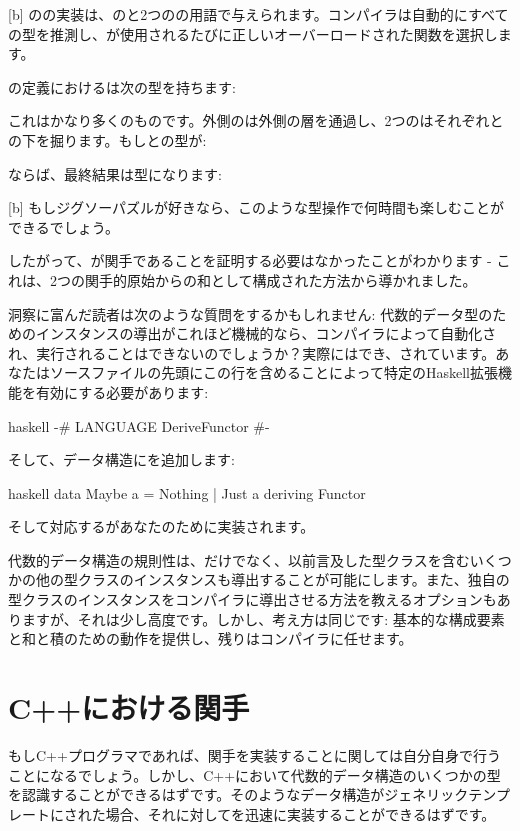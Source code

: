 [b]
のの実装は、のと2つのの用語で与えられます。コンパイラは自動的にすべての型を推測し、が使用されるたびに正しいオーバーロードされた関数を選択します。

の定義におけるは次の型を持ちます: 

これはかなり多くのものです。外側のは外側の層を通過し、2つのはそれぞれとの下を掘ります。もしとの型が: 

ならば、最終結果は型になります: 

[b]
もしジグソーパズルが好きなら、このような型操作で何時間も楽しむことができるでしょう。

したがって、が関手であることを証明する必要はなかったことがわかります - これは、2つの関手的原始からの和として構成された方法から導かれました。

洞察に富んだ読者は次のような質問をするかもしれません: 代数的データ型のためのインスタンスの導出がこれほど機械的なら、コンパイラによって自動化され、実行されることはできないのでしょうか？実際にはでき、されています。あなたはソースファイルの先頭にこの行を含めることによって特定のHaskell拡張機能を有効にする必要があります: 

\begin{snip}{haskell}
{-# LANGUAGE DeriveFunctor #-}
\end{snip}
そして、データ構造にを追加します: 

\begin{snip}{haskell}
data Maybe a = Nothing | Just a deriving Functor
\end{snip}
そして対応するがあなたのために実装されます。

代数的データ構造の規則性は、だけでなく、以前言及した型クラスを含むいくつかの他の型クラスのインスタンスも導出することが可能にします。また、独自の型クラスのインスタンスをコンパイラに導出させる方法を教えるオプションもありますが、それは少し高度です。しかし、考え方は同じです: 基本的な構成要素と和と積のための動作を提供し、残りはコンパイラに任せます。

\section{C++における関手}

もしC++プログラマであれば、関手を実装することに関しては自分自身で行うことになるでしょう。しかし、C++において代数的データ構造のいくつかの型を認識することができるはずです。そのようなデータ構造がジェネリックテンプレートにされた場合、それに対してを迅速に実装することができるはずです。


